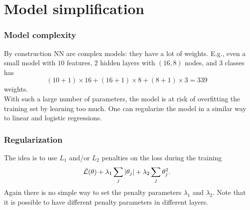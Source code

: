 \section{Model simplification}
\begin{frame}
\frametitle{Model complexity}
By construction NN are complex models: they have a lot of weights. E.g., even a small model with $10$ features, $2$ hidden layers with $(16,8)$ nodes, and 3 classes has 
$$
(10+1)\times 16 + (16+1)\times 8 + (8+1)\times 3 = 339
$$
weights. \\
\vspace{0.3cm}
With such a large number of parameters, the model is at risk of overfitting the training set by learning too much. One can regularize the model in a similar way to linear and logistic regressions.
\end{frame}
\begin{frame}
\frametitle{Regularization}
The idea is to use $L_1$ and/or $L_2$ penalties on the loss during the training
$$
\bar{\cal L}(\theta) + \lambda_1 \sum_{j} |\theta_j| + \lambda_2 \sum_{j} \theta_j^2.
$$ 
Again there is no simple way to set the penalty parameters $\lambda_1$ and $\lambda_2$. Note that it is possible to have different penalty parameters in different layers.
\end{frame}



